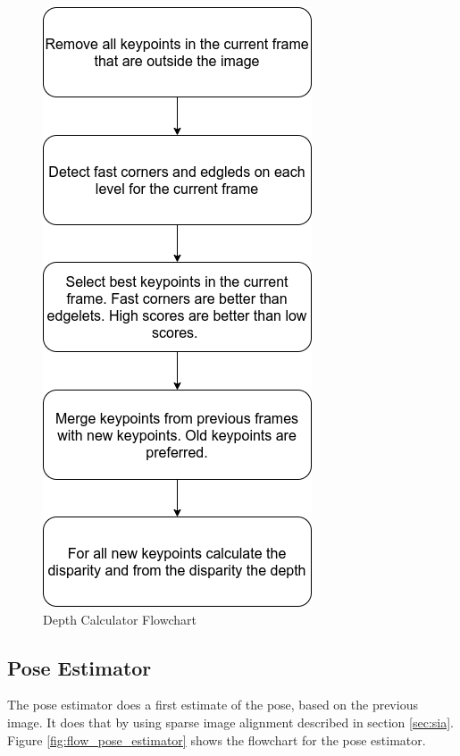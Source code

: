 \documentclass[11pt,a4paper,titlepage,oneside]{report}
\begin{document}
\begin{figure}[H]
  \centering
  \includegraphics[scale=0.3]{img/flow_depth_calculator.png}
  \caption{Depth Calculator Flowchart}\label{fig:flow_depth_calculator}
\end{figure}

\newpage\subsection{Pose Estimator}

The pose estimator does a first estimate of the pose, based on the previous image. It does that by using sparse image alignment described in section \ref{sec:sia}. Figure \ref{fig:flow_pose_estimator} shows the flowchart for the pose estimator.
\end{document}
